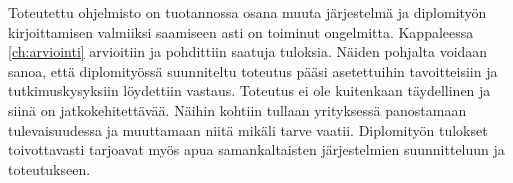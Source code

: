 Toteutettu ohjelmisto on tuotannossa osana muuta järjestelmä ja diplomityön kirjoittamisen valmiiksi saamiseen asti on toiminut ongelmitta. Kappaleessa \ref{ch:arviointi} arvioitiin ja pohdittiin saatuja tuloksia. Näiden pohjalta voidaan sanoa, että diplomityössä suunniteltu toteutus pääsi asetettuihin tavoitteisiin ja tutkimuskysyksiin löydettiin vastaus. Toteutus ei ole kuitenkaan täydellinen ja siinä on jatkokehitettävää. Näihin kohtiin tullaan yrityksessä panostamaan tulevaisuudessa ja muuttamaan niitä mikäli tarve vaatii. Diplomityön tulokset toivottavasti tarjoavat myös apua samankaltaisten järjestelmien suunnitteluun ja toteutukseen.